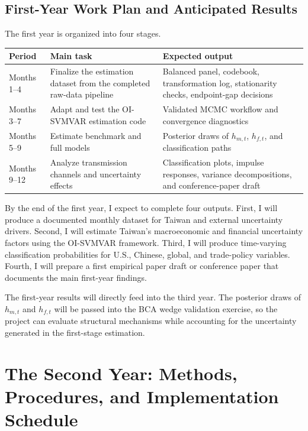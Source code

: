 \documentclass[12pt]{article}
\begin{document}
\subsection{First-Year Work Plan and Anticipated Results}

The first year is organized into four stages.

\begin{center}
\begin{tabular}{p{}p{}p{}}
\toprule
Period & Main task & Expected output \\
\midrule
Months 1--4 &
Finalize the estimation dataset from the completed raw-data pipeline &
Balanced panel, codebook, transformation log, stationarity checks, endpoint-gap decisions \\
\addlinespace
Months 3--7 &
Adapt and test the OI-SVMVAR estimation code &
Validated MCMC workflow and convergence diagnostics \\
\addlinespace
Months 5--9 &
Estimate benchmark and full models &
Posterior draws of $h_{m,t}$, $h_{f,t}$, and classification paths \\
\addlinespace
Months 9--12 &
Analyze transmission channels and uncertainty effects &
Classification plots, impulse responses, variance decompositions, and
conference-paper draft \\
\bottomrule
\end{tabular}
\end{center}

By the end of the first year, I expect to complete four outputs. First, I will produce a documented
monthly dataset for Taiwan and external uncertainty drivers. Second, I will estimate Taiwan's
macroeconomic and financial uncertainty factors using the OI-SVMVAR framework. Third, I will
produce time-varying classification probabilities for U.S., Chinese, global, and trade-policy
variables. Fourth, I will prepare a first empirical paper draft or conference paper that documents
the main first-year findings.

The first-year results will directly feed into the third year. The posterior draws of
$h_{m,t}$ and $h_{f,t}$ will be passed into the BCA wedge validation exercise, so the project can
evaluate structural mechanisms while accounting for the uncertainty generated in the first-stage
estimation.

\section{The Second Year: Methods, Procedures, and Implementation Schedule}
\end{document}
